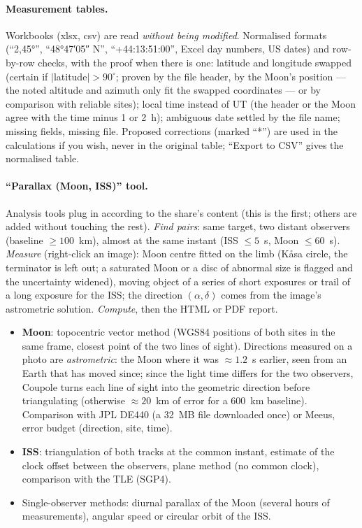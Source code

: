 \paragraph{Measurement tables.} Workbooks (xlsx, csv) are read \emph{without being modified}. Normalised formats
(“2,45°”, “48°47′05″ N”, “+44:13:51:00”, Excel day numbers, US dates) and row-by-row checks, with the proof when
there is one: latitude and longitude swapped (certain if $|$latitude$| > 90^\circ$; proven by the file header, by the
Moon's position — the noted altitude and azimuth only fit the swapped coordinates — or by comparison with reliable
sites); local time instead of UT (the header or the Moon agree with the time minus 1 or 2~h); ambiguous date settled
by the file name; missing fields, missing file. Proposed corrections (marked “*”) are used in the calculations if
you wish, never in the original table; “Export to CSV” gives the normalised table.

\paragraph{“Parallax (Moon, ISS)” tool.} Analysis tools plug in according to the share's content (this is the first;
others are added without touching the rest). \emph{Find pairs}: same target, two distant observers (baseline
$\ge 100$~km), almost at the same instant (ISS $\le 5$~s, Moon $\le 60$~s). \emph{Measure} (right-click an image):
Moon centre fitted on the limb (Kåsa circle, the terminator is left out; a saturated Moon or a disc of abnormal size
is flagged and the uncertainty widened), moving object of a series of short exposures or trail of a long exposure for
the ISS; the direction $(\alpha, \delta)$ comes from the image's astrometric solution. \emph{Compute}, then the HTML or
PDF report.
\begin{itemize}
\item \textbf{Moon}: topocentric vector method (WGS84 positions of both sites in the same frame, closest point of the
two lines of sight). Directions measured on a photo are \emph{astrometric}: the Moon where it was $\approx 1.2$~s
earlier, seen from an Earth that has moved since; since the light time differs for the two observers, Coupole turns
each line of sight into the geometric direction before triangulating (otherwise $\approx 20$~km of error for a 600~km
baseline). Comparison with JPL DE440 (a 32~MB file downloaded once) or Meeus, error budget (direction, site, time).
\item \textbf{ISS}: triangulation of both tracks at the common instant, estimate of the clock offset between the
observers, plane method (no common clock), comparison with the TLE (SGP4).
\item Single-observer methods: diurnal parallax of the Moon (several hours of measurements), angular speed or
circular orbit of the ISS.
\end{itemize}

